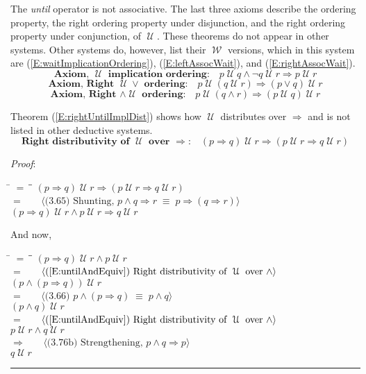 \documentclass[12pt, fleqn, leqno]{article}
\newcommand{\lgap}{2pt}                             %
\newcommand{\mymathindent}{24pt}                    %
\newcommand{\equivs}{\ensuremath{\;\equiv\;}}       %
\newcommand{\impl}{\ensuremath{\Rightarrow}}        %
\newcommand{\Until}{\;\mathcal{U}\;}
\newcommand{\Wait}{\;\mathcal{W}\;}
\newcommand{\myqed}{\rule[-.23ex]{1.2ex}{2.0ex}}
\newcommand{\myqedtab}{\hspace{384pt}}              %
\newcommand{\Gll} {\langle}                         %
\newcommand{\Ggg} {\rangle}                         %
\newcommand{\Hint}[1]     {\ \ \ $\Gll              \mbox{#1} \Ggg$ }   %
\begin{document}
The \textit{until} operator is not associative.
The last three axioms describe the ordering property, the right ordering property under disjunction, and the right ordering property under conjunction, of $\Until$.
These theorems do not appear in other systems.
Other systems do, however, list their $\Wait$ versions, which in this system are (\ref{E:waitImplicationOrdering}), (\ref{E:leftAssocWait}), and (\ref{E:rightAssocWait}).
\begin{equation}\label{E:untilImplicationOrdering}
\textbf{Axiom, $\Until$ implication ordering:}\quad p \Until q \land \neg q \Until r \impl p \Until r
\end{equation}
\begin{equation}\label{E:leftAssocUntil}
\textbf{Axiom, Right $\Until \lor$ ordering:}\quad p \Until (q \Until r) \impl (p\lor q) \Until r
\end{equation}
\begin{equation}\label{E:rightAssocUntil}
\textbf{Axiom, Right $\land \Until$ ordering:}\quad p \Until (q\land r) \impl (p \Until q) \Until r
\end{equation}

Theorem (\ref{E:rightUntilImplDist}) shows how $\Until$ distributes over $\impl$ and is not listed in other deductive systems.
\begin{equation}\label{E:rightUntilImplDist}
\textbf{Right distributivity of $\Until$ over $\impl$:}\quad (p \impl q) \Until r\impl (p \Until r \impl q \Until r)
\end{equation}

\emph{Proof}:
\begin{tabbing}
\hspace{\mymathindent} \= $= \;$ \= \myqedtab \= \kill
  \> \>   $(p \impl q) \Until r\impl (p \Until r \impl q \Until r)$\\[\lgap]
  \> $=$  \>  \Hint{(3.65) Shunting, $p\land q\impl r\equivs p\impl (q\impl r)$}\\[\lgap]
  \> \>   $(p \impl q) \Until r\land p \Until r \impl q \Until r$
\end{tabbing}
And now,
\begin{tabbing}
\hspace{\mymathindent} \= $= \;$ \= \myqedtab \= \kill
  \> \>   $(p \impl q) \Until r\land p \Until r$\\[\lgap]
  \> $=$ \> \Hint{(\ref{E:untilAndEquiv}) Right distributivity of $\Until$ over $\land$} \\[\lgap]
  \> \>   $(p\land (p\impl q)) \Until r$\\[\lgap]
  \> $=$  \>  \Hint{(3.66) $p\land (p \impl q) \equivs p \land q$}\\[\lgap]
  \> \>   $(p\land q) \Until r$\\[\lgap]
  \> $=$ \> \Hint{(\ref{E:untilAndEquiv}) Right distributivity of $\Until$ over $\land$} \\[\lgap]
  \> \>   $p\Until r\land q\Until r$\\[\lgap]
  \> $\impl$ \> \Hint{(3.76b) Strengthening, $p\land q \impl p$} \\[\lgap]
  \> \>   $q\Until r$ \quad \myqed
\end{tabbing}
\end{document}
